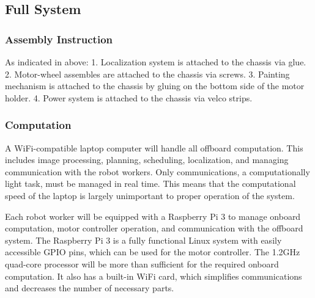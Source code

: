 
\subsection{Full System}
\label{sec:hardware_full_system}

\subsubsection{Assembly Instruction}
\label{sec:full_assemb}
As indicated in above:
1. Localization system is attached to the chassis via glue.
2. Motor-wheel assembles are attached to the chassis via screws.
3. Painting mechanism is attached to the chassis by gluing on the bottom side of the motor holder.
4. Power system is attached to the chassis via velco strips.

\subsubsection{Computation}
\label{sec:full_computation}
A WiFi-compatible laptop computer will handle all offboard computation. This includes image processing, planning, scheduling, localization, and managing communication with the robot workers. Only communications, a computationally light task, must be managed in real time. This means that the computational speed of the laptop is largely unimportant to proper operation of the system. 

Each robot worker will be equipped with a Raspberry Pi 3 to manage onboard computation, motor controller operation, and communication with the offboard system. The Raspberry Pi 3 is a fully functional Linux system with easily accessible GPIO pins, which can be used for the motor controller. The 1.2GHz quad-core processor will be more than sufficient for the required onboard computation. It also has a built-in WiFi card, which simplifies communications and decreases the number of necessary parts. 